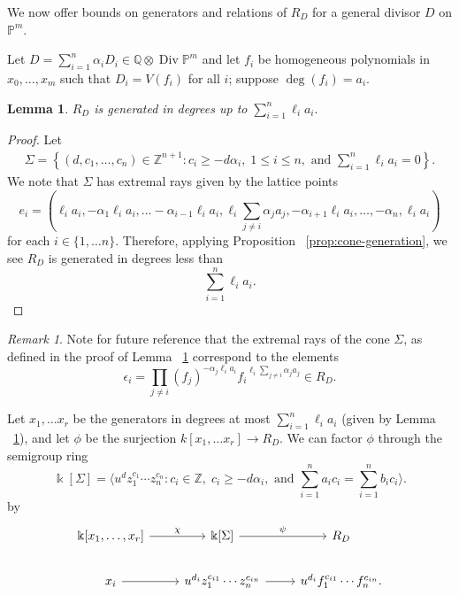 \documentclass{amsart}
\theoremstyle{plain}
\newtheorem{lem}[thm]{Lemma}
\theoremstyle{definition}
\theoremstyle{remark}
\newtheorem{rem}[thm]{Remark}
\numberwithin{equation}{section}
\newcommand\bq{{\mathbb Q}}
\newcommand\bp{{\mathbb P}}
\newcommand\bz{{\mathbb Z}}
\newcommand\bk{{\Bbbk}}
\DeclareMathOperator\di{Div}
\newcommand\bida{a}
\newcommand\bidb{b}
\begin{document}
We now offer bounds on generators and relations of $R_D$ for a general divisor $D$ on $\bp^m$.

Let $D = \sum_{i=1}^n \alpha_i D_i \in \bq \otimes \di \bp^m$ and let $f_i$ be homogeneous polynomials in $x_0, \ldots, x_m$ such that $D_i = V(f_i)$ for all $i$; suppose $\deg(f_i) = a_i$.

\begin{lem} \label{lem:proj-generators}
$R_D$ is generated in degrees up to $\sum_{i=1}^n \ell_i a_i.$
\end{lem}
\begin{proof}
Let 
\begin{align}\label{eqn:Sigma-def}
	\Sigma = \left \{(d, c_1, \ldots, c_n) \in \bz^{n+1} : c_i \geq - d \alpha_i, \; 1 \leq i \leq n, \text{ and } \sum_{i=1}^{n} \ell_i \bida_i = 0 \right \}.
\end{align}
We note that $\Sigma$ has extremal rays given by the lattice points 
\begin{equation}\label{defn:e-i-proj}
	e_i = \left(\ell_i \bida_i, - \alpha_1 \ell_i \bida_i, \ldots -\alpha_{i-1} \ell_i \bida_i, \ell_i \sum_{j\ne i} \alpha_j \bida_j, -\alpha_{i+1} \ell_i \bida_i, \ldots, -\alpha_n, \ell_i \bida_i \right)
\end{equation}
for each $i\in \{1, \ldots n\}$.
Therefore, applying Proposition ~\ref{prop:cone-generation}, we see $R_D$ is generated in degrees less than
\[
	\sum_{i=1}^n \ell_i a_i.
\]
\end{proof}

\begin{rem}
\label{rem:pm-extremal-rays}
Note for future reference that the extremal rays of the cone $\Sigma$, as defined in the proof of Lemma ~\ref{lem:proj-generators} correspond to the elements
\begin{equation}
\label{eqn:epsilon-def-proj}
	\epsilon_i = \prod_{j\ne i} (f_j)^{-\alpha_j \ell_i a_i} {f_i}^{\ell_i \sum_{j\ne i} \alpha_j a_j}\in R_D.
\end{equation}
\end{rem}



Let $x_1, \ldots x_r$ be the generators in degrees at most $\sum_{i=1}^n \ell_i \bida_i$ (given by Lemma ~\ref{lem:proj-generators}), and let $\phi$ be the surjection $k[x_1, \ldots x_r] \to R_D$.  We can factor $\phi$ through the semigroup ring 
\[
	\bk[\Sigma] =  \langle u^d z_1^{c_1} \cdots z_n^{c_n} : c_i \in \mathbb{Z}, \; c_i \geq -d \alpha_i, \mbox{ and }\sum_{i=1}^{n} \bida_i c_i = \sum_{i=1}^{n} \bidb_i c_i \rangle. 
\]
by
\[
\begin{tikzcd}
\bk[x_1,\ldots, x_r] \ar {r}{\chi} & \bk[\Sigma] \ar {r}{\psi} & R_D \\
x_i \ar r & u^{d_i}z_1^{c_{i1}} \cdots z_n^{c_{in}} \ar r & u^{d_i}f_1^{c_{i1}} \cdots f_n^{c_{in}}.
\end{tikzcd}
\]
\end{document}
